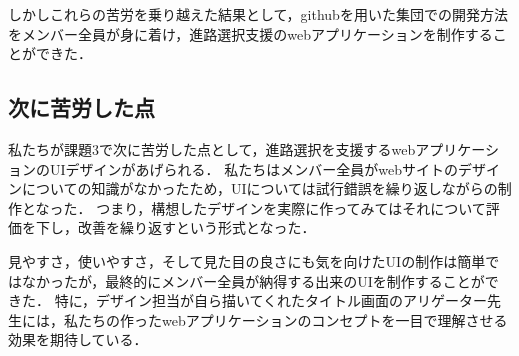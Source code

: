 \documentclass[a4j，titlepage]{jarticle}
\begin{document}
\begin{itemize}
しかしこれらの苦労を乗り越えた結果として，githubを用いた集団での開発方法をメンバー全員が身に着け，進路選択支援のwebアプリケーションを制作することができた．
\subsection{次に苦労した点}
私たちが課題3で次に苦労した点として，進路選択を支援するwebアプリケーションのUIデザインがあげられる．
私たちはメンバー全員がwebサイトのデザインについての知識がなかったため，UIについては試行錯誤を繰り返しながらの制作となった．
つまり，構想したデザインを実際に作ってみてはそれについて評価を下し，改善を繰り返すという形式となった．

見やすさ，使いやすさ，そして見た目の良さにも気を向けたUIの制作は簡単ではなかったが，最終的にメンバー全員が納得する出来のUIを制作することができた．
特に，デザイン担当が自ら描いてくれたタイトル画面のアリゲーター先生には，私たちの作ったwebアプリケーションのコンセプトを一目で理解させる効果を期待している．\\



\end{itemize}
\end{document}

